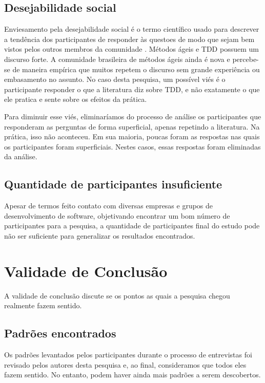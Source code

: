\subsection{Desejabilidade social}

Enviesamento pela desejabilidade social é o termo científico usado para descrever
a tendência dos participantes de responder às questoes de modo que sejam bem vistos pelos
outros membros da comunidade \cite{crowne}.
Métodos ágeis e TDD possuem um discurso forte. A comunidade brasileira de métodos
ágeis ainda é nova e percebe-se de maneira empírica que muitos repetem o discurso
sem grande experiência ou embasamento no assunto.
No caso desta pesquisa, um possível viés é o participante responder o que
a literatura diz sobre TDD, e não exatamente o que ele pratica e sente sobre
os efeitos da prática. 

Para diminuir esse viés, eliminaríamos do processo de análise os participantes
que responderam as perguntas de forma superficial, apenas repetindo a literatura. Na prática,
isso não aconteceu. Em sua maioria, poucas foram as respostas nas quais os participantes
foram superficiais. Nestes casos, essas respostas foram eliminadas da análise.

\subsection{Quantidade de participantes insuficiente}

Apesar de termos feito contato
com diversas empresas e grupos de desenvolvimento de software,
objetivando encontrar um bom número de participantes para a pesquisa,
a quantidade de participantes final do estudo pode não ser suficiente para generalizar
os resultados encontrados. 

\section{Validade de Conclusão}

A validade de conclusão discute se os pontos as quais a pesquisa chegou realmente
fazem sentido.

\subsection{Padrões encontrados}

Os padrões levantados pelos participantes durante o processo de entrevistas
foi revisado pelos autores desta pesquisa e, ao final, consideramos que todos
eles fazem sentido.
No entanto, podem haver ainda mais padrões a serem descobertos.

